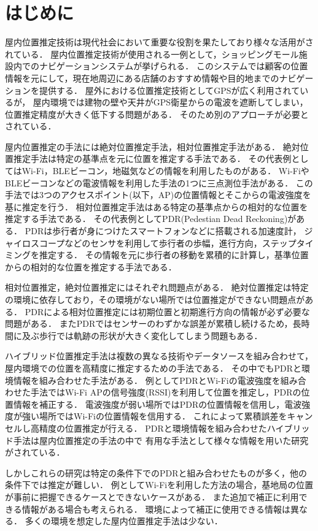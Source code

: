 
\section{はじめに}
屋内位置推定技術は現代社会において重要な役割を果たしており様々な活用がされている．
屋内位置推定技術が使用される一例として，ショッピングモール施設内でのナビゲーションシステムが挙げられる\cite{burasapo}．
このシステムでは顧客の位置情報を元にして，現在地周辺にある店舗のおすすめ情報や目的地までのナビゲーションを提供する．
屋外における位置推定技術としてGPSが広く利用されているが，
屋内環境では建物の壁や天井がGPS衛星からの電波を遮断してしまい，
位置推定精度が大きく低下する問題がある．
そのため別のアプローチが必要とされている．

屋内位置推定の手法には絶対位置推定手法，相対位置推定手法がある．
絶対位置推定手法は特定の基準点を元に位置を推定する手法である．
その代表例としてはWi-Fi，BLEビーコン，地磁気などの情報を利用したものがある．
Wi-FiやBLEビーコンなどの電波情報を利用した手法の1つに三点測位手法がある．
この手法では3つのアクセスポイント(以下，AP)の位置情報とそこからの電波強度を基に推定を行う．
相対位置推定手法はある特定の基準点からの相対的な位置を推定する手法である．
その代表例としてPDR(Pedestian Dead Reckoning)がある．
PDRは歩行者が身につけたスマートフォンなどに搭載される加速度計，
ジャイロスコープなどのセンサを利用して歩行者の歩幅，進行方向，ステップタイミングを推定する．
その情報を元に歩行者の移動を累積的に計算し，基準位置からの相対的な位置を推定する手法である．

相対位置推定，絶対位置推定にはそれぞれ問題点がある．
絶対位置推定は特定の環境に依存しており，その環境がない場所では位置推定ができない問題点がある．
PDRによる相対位置推定には初期位置と初期進行方向の情報が必ず必要な問題がある．
またPDRではセンサーのわずかな誤差が累積し続けるため，長時間に及ぶ歩行では軌跡の形状が大きく変化してしまう問題もある．

ハイブリッド位置推定手法は複数の異なる技術やデータソースを組み合わせて，
屋内環境での位置を高精度に推定するための手法である．
その中でもPDRと環境情報を組み合わせた手法がある．
例としてPDRとWi-Fiの電波強度を組み合わせた手法ではWi-Fi APの信号強度(RSSI)を利用して位置を推定し，PDRの位置情報を補正する．
電波強度が弱い場所ではPDRの位置情報を信用し，電波強度が強い場所ではWi-Fiの位置情報を信用する．
これによって累積誤差をキャンセルし高精度の位置推定が行える．
PDRと環境情報を組み合わせたハイブリッド手法は屋内位置推定の手法の中で
有用な手法として様々な情報を用いた研究がされている．

しかしこれらの研究は特定の条件下でのPDRと組み合わせたものが多く，他の条件下では推定が難しい．
例としてWi-Fiを利用した方法の場合，基地局の位置が事前に把握できるケースとできないケースがある．
また追加で補正に利用できる情報がある場合も考えられる．
環境によって補正に使用できる情報は異なる．
多くの環境を想定した屋内位置推定手法は少ない．

